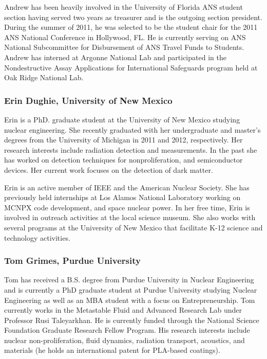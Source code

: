 Andrew has been heavily involved in the University of Florida ANS student
section having served two years as treasurer and is the outgoing section
president. During the summer of 2011, he was selected to be the student chair
for the 2011 ANS National Conference in Hollywood, FL. He is currently serving
on ANS National Subcommittee for Disbursement of ANS Travel Funds to
Students. Andrew has interned at Argonne National Lab and participated in the
Nondestructive Assay Applications for International Safeguards program held at
Oak Ridge National Lab.

\subsubsection*{Erin Dughie, University of New Mexico}

Erin is a PhD. graduate student at the University of New Mexico studying nuclear
engineering. She recently graduated with her undergraduate and master's degrees
from the University of Michigan in 2011 and 2012, respectively. Her research
interests include radiation detection and measurements. In the past she has
worked on detection techniques for nonproliferation, and semiconductor
devices. Her current work focuses on the detection of dark matter.

Erin is an active member of IEEE and the American Nuclear Society. She has
previously held internships at Los Alamos National Laboratory working on MCNPX
code development, and space nuclear power. In her free time, Erin is involved in
outreach activities at the local science museum. She also works with several
programs at the University of New Mexico that facilitate K-12 science and
technology activities.

\subsubsection*{Tom Grimes, Purdue University}

Tom has received a B.S. degree from Purdue University in Nuclear Engineering and
is currently a PhD graduate student at Purdue University studying Nuclear
Engineering as well as an MBA student with a focus on Entrepreneurship. Tom
currently works in the Metastable Fluid and Advanced Research Lab under
Professor Rusi Taleyarkhan. He is currently funded through the National Science
Foundation Graduate Research Fellow Program. His research interests include
nuclear non-proliferation, fluid dynamics, radiation transport, acoustics, and
materials (he holds an international patent for PLA-based coatings).

